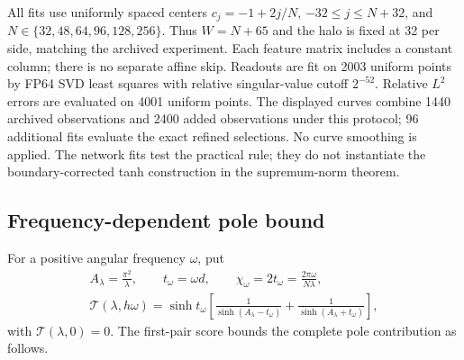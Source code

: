 \documentclass[11pt]{article}
\begin{document}
All fits use uniformly spaced centers
$c_j=-1+2j/N$, $-32\le j\le N+32$, and
$N\in\{32,48,64,96,128,256\}$.
Thus $W=N+65$ and the halo is fixed at 32 per side, matching
the archived experiment. Each feature matrix includes a constant column;
there is no separate affine skip. Readouts are fit on 2003 uniform points
by FP64 SVD least squares with relative singular-value cutoff $2^{-52}$.
Relative $L^2$ errors are evaluated on 4001 uniform points. The displayed
curves combine 1440 archived observations and 2400 added observations under
this protocol; 96 additional fits evaluate the exact refined selections.
No curve smoothing is applied. The network fits test the practical rule;
they do not instantiate the boundary-corrected tanh construction in the
supremum-norm theorem.


\subsection{Frequency-dependent pole bound}
For a positive angular frequency $\omega$, put
\begin{equation}
 \begin{gathered}
 A_\lambda=\frac{\pi^2}{\lambda},\qquad
 t_\omega=\omega d,\qquad
 \chi_\omega=2t_\omega=\frac{2\pi\omega}{N\lambda},\\
 \mathcal T(\lambda,h\omega)=\sinh t_\omega
 \left[\frac1{\sinh(A_\lambda-t_\omega)}
       +\frac1{\sinh(A_\lambda+t_\omega)}\right],
 \end{gathered}
 \label{eq:bandwidth-pair}
\end{equation}
with $\mathcal T(\lambda,0)=0$. The first-pair score bounds the complete
pole contribution as follows.
\end{document}
